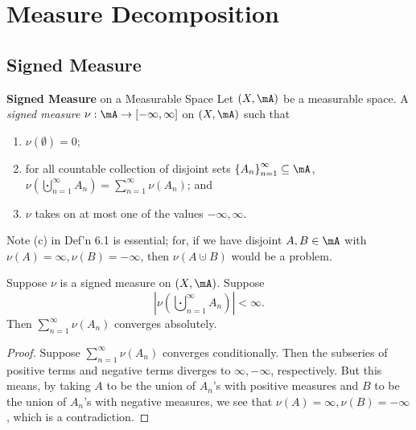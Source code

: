 \documentclass[pmath451]{subfiles}
\begin{document}
    \section{Measure Decomposition}
    
    \subsection{Signed Measure}

    \begin{definition}{\textbf{Signed Measure} on a Measurable Space}
        Let $\left( X,\mA \right)$ be a measurable space. A \emph{signed measure} $\nu:\mA\to\left[ -\infty,\infty \right]$ on $\left( X,\mA \right)$ such that
        \begin{enumerate}
            \item $\nu\left( \emptyset \right)=0$;
            \item for all countable collection of disjoint sets $\left\lbrace A_n \right\rbrace^{\infty}_{n=1}\subseteq\mA$, $\nu\left( \bigcupdot^{\infty}_{n=1}A_n \right) = \sum^{\infty}_{n=1} \nu\left( A_n \right)$; and
            \item $\nu$ takes on at most one of the values $-\infty,\infty$.
        \end{enumerate}
    \end{definition}
    
    \np Note (c) in Def'n 6.1 is essential; for, if we have disjoint $A,B\in\mA$ with $\nu\left( A \right) = \infty, \nu\left( B \right)=-\infty$, then $\nu\left( A\cupdot B \right)$ would be a problem.

    \begin{prop}{}
        Suppose $\nu$ is a signed measure on $\left( X,\mA \right)$. Suppose
        \begin{equation*}
            \left| \nu\left( \bigcupdot^{\infty}_{n=1}A_n \right) \right| < \infty.
        \end{equation*}
        Then $\sum^{\infty}_{n=1}\nu\left( A_n \right)$ converges absolutely.
    \end{prop}

    \begin{proof}
        Suppose $\sum^{\infty}_{n=1} \nu\left( A_n \right)$ converges conditionally. Then the subseries of positive terms and negative terms diverges to $\infty,-\infty$, respectively. But this means, by taking $A$ to be the union of $A_n$'s with positive measures and $B$ to be the union of $A_n$'s with negative measures, we see that $\nu\left( A \right)=\infty, \nu\left( B \right)=-\infty$, which is a contradiction.
    \end{proof}
    
\end{document}
